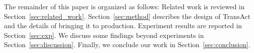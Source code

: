 The remainder of this paper is organized as follows: Related
work is reviewed in Section~\ref{sec:related_work}. Section~\ref{sec:method} describes the design of TransAct and the details of bringing it to production. Experiment results are reported in Section~\ref{sec:exp}. We discuss some findings beyond experiments in Section~\ref{sec:discussion}. Finally, we conclude our work in Section~\ref{sec:conclusion}.














